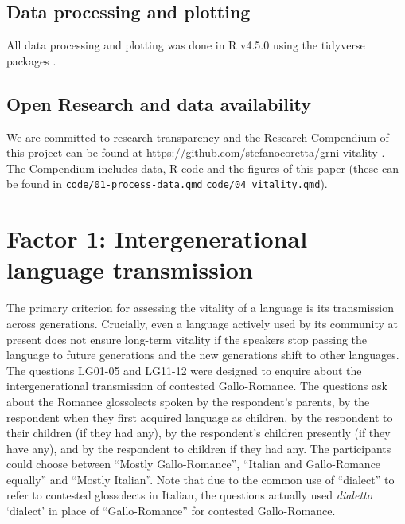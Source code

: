\documentclass[a4paper,11pt]{article}
\begin{document}
\subsection{Data processing and plotting}

All data processing and plotting was done in R v4.5.0 \citep{rcoreteam2025} using the tidyverse packages \citep{wickham2017, wickham2019}.

\subsection{Open Research and data availability}

We are committed to research transparency and the Research Compendium of this project can be found at \url{https://github.com/stefanocoretta/grni-vitality} \citep{coretta2025a}. The Compendium includes data, R code and the figures of this paper (these can be found in \texttt{code/01-process-data.qmd} \texttt{code/04\_vitality.qmd}).

\section{Factor 1: Intergenerational language transmission}

The primary criterion for assessing the vitality of a language is its transmission across generations. Crucially, even a language actively used by its community at present does not ensure long-term vitality if the speakers stop passing the language to future generations and the new generations shift to other languages.
The questions LG01-05 and LG11-12 were designed to enquire about the intergenerational transmission of contested Gallo-Romance. The questions ask about the Romance glossolects spoken by the respondent's parents, by the respondent when they first acquired language as children, by the respondent to their children (if they had any), by the respondent's children presently (if they have any), and by the respondent to children if they had any. The participants could choose between ``Mostly Gallo-Romance'', ``Italian and Gallo-Romance equally'' and ``Mostly Italian''. Note that due to the common use of ``dialect'' to refer to contested glossolects in Italian, the questions actually used \textit{dialetto} `dialect' in place of ``Gallo-Romance'' for contested Gallo-Romance.
\end{document}
